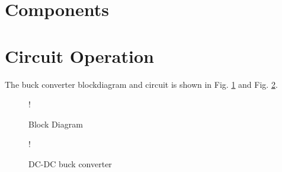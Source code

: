 \documentclass[journal,12pt,twocolumn]{IEEEtran}
\begin{document}
\section{Components}
\begin{table}[!h]
\centering

\caption{}
\label{table:components}
\end{table}

\section{Circuit Operation}
The buck converter blockdiagram and circuit is shown in Fig. \ref{fig1} and Fig. \ref{fig2}.

\begin{figure}[!h]
\centering
\resizebox {\columnwidth} {!} {

}
\caption{Block Diagram} 
\label{fig1}
\end{figure}
\begin{figure}[!h]
\centering
\resizebox {\columnwidth} {!} {

}
\caption{DC-DC buck converter} 
\label{fig2}
\end{figure}
\end{document}
